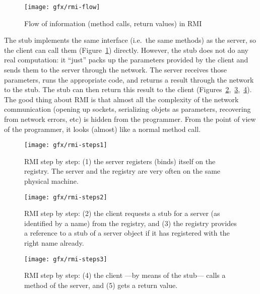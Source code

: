 \begin{figure}[hbtp]
  \centering
  \texttt{[image: gfx/rmi-flow]}
  \caption{Flow of information (method calls, return values) in RMI}
  \label{fig:rmiflow}
\end{figure}

The stub implements the same interface (i.e.~the same methods) as the
server, so the client can call them (Figure~\ref{fig:rmiflow}) directly. 
However, the stub does not do any
real computation: it ``just'' packs up the parameters provided by the client and
sends them to the server through the network. The server receives
those parameters, runs the appropriate code, and returns a result
through the network to the stub. The stub can then return this result
to the client 
(Figures~\ref{fig:rmiflow1},~\ref{fig:rmiflow2},~\ref{fig:rmiflow3}). 
The good thing about RMI is that almost all the
complexity of the network communication (opening up sockets,
serializing objets as parameters, recovering from network errors, etc)
is hidden from the programmer. From the point of view of the programmer, it
looks (almost) like a normal method call. 

\begin{figure}[hbtp]
  \centering
  \texttt{[image: gfx/rmi-steps1]}
  \caption{RMI step by step: (1) the server registers (binds) itself
    on the registry. The server and the registry are very often on the
    same physical machine. }
  \label{fig:rmiflow1}
\end{figure}

\begin{figure}[hbtp]
  \centering
  \texttt{[image: gfx/rmi-steps2]}
  \caption{RMI step by step: (2) the client requests a stub for a
    server (as identified by a name) from the registry, 
    and (3) the registry provides a
    reference to a stub of a server object if it
    has registered with the right name already. }
  \label{fig:rmiflow2}
\end{figure}

\begin{figure}[hbtp]
  \centering
  \texttt{[image: gfx/rmi-steps3]}
  \caption{RMI step by step: (4) the client ---by means of the stub---
  calls a method of the server, and (5) gets a return value. }
  \label{fig:rmiflow3}
\end{figure}


